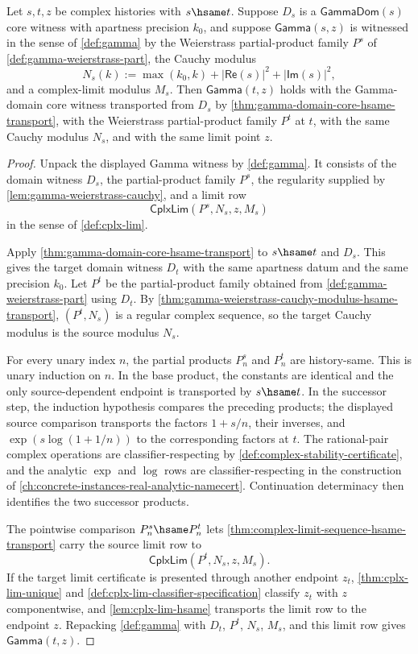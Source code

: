 \begin{theorem}
\label{thm:gamma-limit-certificate-hsame-transport}
Let $s,t,z$ be complex histories with $s\hsame t$. Suppose $D_s$ is a $\mathsf{GammaDom}(s)$ core witness with apartness precision $k_0$, and suppose $\mathsf{Gamma}(s,z)$ is witnessed in the sense of \autoref{def:gamma} by the Weierstrass partial-product family $P^s$ of \autoref{def:gamma-weierstrass-part}, the Cauchy modulus
$$
N_s(k):=\max(k_0,k)+|\mathsf{Re}(s)|^2+|\mathsf{Im}(s)|^2,
$$
and a complex-limit modulus $M_s$. Then $\mathsf{Gamma}(t,z)$ holds with the Gamma-domain core witness transported from $D_s$ by \autoref{thm:gamma-domain-core-hsame-transport}, with the Weierstrass partial-product family $P^t$ at $t$, with the same Cauchy modulus $N_s$, and with the same limit point $z$.
\end{theorem}
\begin{proof}
Unpack the displayed Gamma witness by \autoref{def:gamma}. It consists of the domain witness $D_s$, the partial-product family $P^s$, the regularity supplied by \autoref{lem:gamma-weierstrass-cauchy}, and a limit row
$$
\mathsf{CplxLim}(P^s,N_s,z,M_s)
$$
in the sense of \autoref{def:cplx-lim}.

Apply \autoref{thm:gamma-domain-core-hsame-transport} to $s\hsame t$ and $D_s$. This gives the target domain witness $D_t$ with the same apartness datum and the same precision $k_0$. Let $P^t$ be the partial-product family obtained from \autoref{def:gamma-weierstrass-part} using $D_t$. By \autoref{thm:gamma-weierstrass-cauchy-modulus-hsame-transport}, $(P^t,N_s)$ is a regular complex sequence, so the target Cauchy modulus is the source modulus $N_s$.

For every unary index $n$, the partial products $P^s_n$ and $P^t_n$ are history-same. This is unary induction on $n$. In the base product, the constants are identical and the only source-dependent endpoint is transported by $s\hsame t$. In the successor step, the induction hypothesis compares the preceding products; the displayed source comparison transports the factors $1+s/n$, their inverses, and $\exp(s\log(1+1/n))$ to the corresponding factors at $t$. The rational-pair complex operations are classifier-respecting by \autoref{def:complex-stability-certificate}, and the analytic $\exp$ and $\log$ rows are classifier-respecting in the construction of \autoref{ch:concrete-instances-real-analytic-namecert}. Continuation determinacy then identifies the two successor products.

The pointwise comparison $P^s_n\hsame P^t_n$ lets \autoref{thm:complex-limit-sequence-hsame-transport} carry the source limit row to
$$
\mathsf{CplxLim}(P^t,N_s,z,M_s).
$$
If the target limit certificate is presented through another endpoint $z_t$, \autoref{thm:cplx-lim-unique} and \autoref{def:cplx-lim-classifier-specification} classify $z_t$ with $z$ componentwise, and \autoref{lem:cplx-lim-hsame} transports the limit row to the endpoint $z$. Repacking \autoref{def:gamma} with $D_t$, $P^t$, $N_s$, $M_s$, and this limit row gives $\mathsf{Gamma}(t,z)$.
\end{proof}

